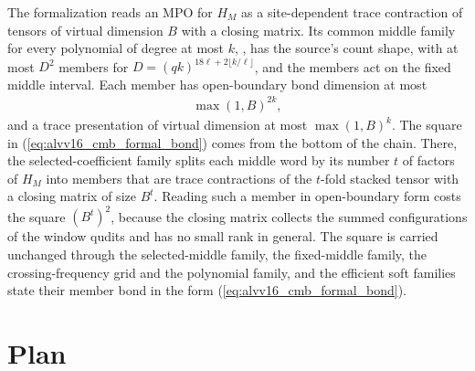 \documentclass{article}
\begin{document}
The formalization reads an MPO for $H_M$ as a site-dependent trace contraction
of tensors of virtual dimension $B$ with a closing matrix. Its common middle
family for every polynomial of degree at most $k$,
,
has the source's count shape, with at most $D^2$ members for
$D=(qk)^{18\ell+2\lfloor k/\ell\rfloor}$, and the members act on the fixed
middle interval. Each member has open-boundary bond dimension at most
\begin{align}
 \max(1,B)^{2k},
 \label{eq:alvv16_cmb_formal_bond}
\end{align}
and a trace presentation of virtual dimension at most $\max(1,B)^k$. The
square in (\ref{eq:alvv16_cmb_formal_bond}) comes from the bottom of the
chain. There, the selected-coefficient family
splits each middle word by its number $t$ of factors of $H_M$ into members
that are trace contractions of the $t$-fold stacked tensor with a closing
matrix of size $B^t$. Reading such a member in open-boundary form costs the
square $(B^t)^2$, because the closing matrix collects the summed
configurations of the window qudits and has no small rank in general. The
square is carried unchanged through the selected-middle family, the
fixed-middle family, the crossing-frequency grid and the polynomial family,
and the efficient soft families state their member bond in the form
(\ref{eq:alvv16_cmb_formal_bond}).

\section{Plan}
\end{document}
